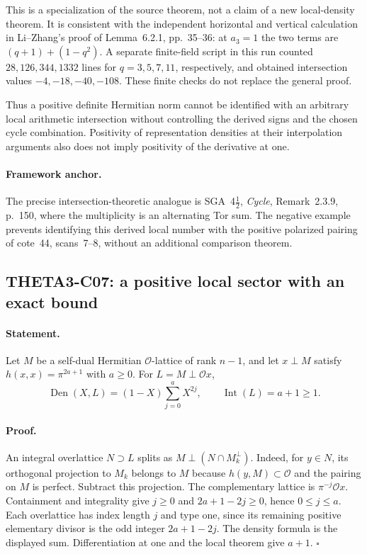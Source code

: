 \documentclass[11pt]{article}
\theoremstyle{definition}\newtheorem{definition}[theorem]{Definition}\newtheorem{remark}[theorem]{Remark}
\begin{document}
This is a specialization of the source theorem, not a claim of a
new local-density theorem. It is consistent with the independent
horizontal and vertical calculation in Li--Zhang's proof of
Lemma~6.2.1, pp.~35--36: at $a_3=1$ the two terms are
$(q+1)+(1-q^2)$. A separate finite-field script in this run counted
$28,126,344,1332$ lines for $q=3,5,7,11$, respectively, and obtained
intersection values $-4,-18,-40,-108$. These finite checks do not
replace the general proof.

Thus a positive definite Hermitian norm cannot be identified with
an arbitrary local arithmetic intersection without controlling the
derived signs and the chosen cycle combination. Positivity of
representation densities at their interpolation arguments also
does not imply positivity of the derivative at one.

\paragraph{Framework anchor.}
The precise intersection-theoretic analogue is SGA~4$\frac12$,
\emph{Cycle}, Remark~2.3.9, p.~150, where the multiplicity is an
alternating Tor sum.  The negative example prevents identifying this
derived local number with the positive polarized pairing of cote~44,
scans~7--8, without an additional comparison theorem.

\subsection{THETA3-C07: a positive local sector with an exact bound}\label{C07}

\paragraph{Statement.}
Let $M$ be a self-dual Hermitian $\mathcal O$-lattice of rank $n-1$,
and let $x\perp M$ satisfy $h(x,x)=\pi^{2a+1}$ with $a\geq0$.
For $L=M\perp\mathcal O x$,
\[
 \operatorname{Den}(X,L)=(1-X)\sum_{j=0}^aX^{2j},
 \qquad \operatorname{Int}(L)=a+1\geq1.
\]

\paragraph{Proof.}
An integral overlattice $N\supset L$ splits as
$M\perp(N\cap M_k^\perp)$. Indeed, for $y\in N$, its orthogonal
projection to $M_k$ belongs to $M$ because $h(y,M)\subset\mathcal O$
and the pairing on $M$ is perfect. Subtract this projection.
The complementary lattice is $\pi^{-j}\mathcal O x$. Containment
and integrality give $j\geq0$ and $2a+1-2j\geq0$, hence
$0\leq j\leq a$. Each overlattice has index length $j$ and type
one, since its remaining positive elementary divisor is the odd
integer $2a+1-2j$. The density formula is the displayed sum.
Differentiation at one and the local theorem give $a+1$.
$\square$
\end{document}
